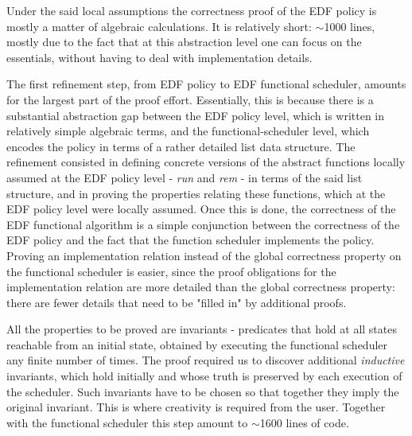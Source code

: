 	Under the said local assumptions the correctness proof of the EDF policy is mostly a matter of algebraic calculations. It is relatively short: $\sim$1000 lines, mostly due to the fact that at this abstraction level one can focus on the essentials, without having to deal with implementation details.

	The first refinement step, from EDF policy to EDF functional scheduler, amounts for the largest part of the proof effort. Essentially, this is because there is a substantial abstraction gap between the EDF policy level, which is written in relatively simple algebraic terms, and the functional-scheduler level, which encodes the policy in terms of a rather detailed list data structure. The refinement consisted in defining concrete versions of the abstract functions locally assumed at the EDF policy level - \emph{run} and \emph{rem} - in terms of the said list structure, and in proving the properties relating these functions, which at the EDF policy level were locally assumed. Once this is done, the correctness of the EDF functional algorithm is a simple conjunction between the correctness of the EDF policy and the fact that the function scheduler implements the policy. Proving an implementation relation instead of the global correctness property on the functional scheduler is easier, since the proof obligations for the implementation relation are more detailed than the global correctness property: there are fewer details that need to be "filled in" by additional proofs.

	All the properties to be proved are invariants - predicates that hold at all states reachable from an initial state, obtained by executing the functional scheduler any finite number of times. The proof required us to discover additional \emph{inductive} invariants, which hold initially and whose truth is preserved by each execution of the scheduler. Such invariants have to be chosen so that together they imply the original invariant. This is where creativity is required from the user. Together with the functional scheduler this step amount to $\sim$1600 lines of code.

